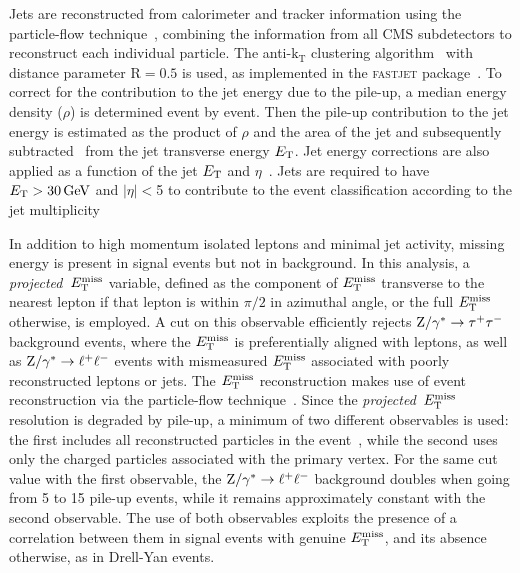 \documentclass[11pt,twoside,a4paper,cmspaper,final,collab]{cms-tdr}
\begin{document}
Jets are reconstructed from calorimeter and tracker information using
the particle-flow technique~\cite{PFT-09-001,jetpas}, combining the information from
all CMS subdetectors to reconstruct each individual particle. The anti-$\mathrm{k_T}$
clustering algorithm~\cite{antikt} with distance parameter $\mathrm{
R}=0.5$ is used, as implemented in the \textsc{fastjet}
package~\cite{Cacciari:fastjet1,Cacciari:fastjet2}.
To correct for the contribution to the jet energy
due to the pile-up, a median energy density ($\rho$) is determined event by event.
Then the pile-up contribution to the jet energy is estimated as the product of $\rho$ and the area of the
jet and subsequently subtracted~\cite{Cacciari:subtraction} from the jet transverse energy $E_{\mathrm{T}}$.
Jet energy corrections are also applied as a function of the jet $E_{\mathrm{T}}$ and $\eta$~\cite{cmsJEC}.
Jets are required to have $E_{\mathrm{T}}>30\,\text{Ge\hspace{-.08em}V}$ and $|\eta|<$5
to contribute to the event classification according to the jet multiplicity

In addition to high momentum isolated leptons and minimal jet activity, missing
energy is present in signal events but not in background.
In this analysis, a \textit{projected}~$E_{\mathrm{T}}^{\text{miss}}$ variable, defined
as the component of $E_{\mathrm{T}}^{\text{miss}}$ transverse to the nearest lepton if that lepton is within
$\pi/2$ in azimuthal angle, or the full $E_{\mathrm{T}}^{\text{miss}}$ otherwise, is employed.
A cut on this observable efficiently rejects $\mathrm{Z}/\gamma^* \to\tau^+\tau^-$ background events, where the $E_{\mathrm{T}}^{\text{miss}}$
is preferentially aligned with leptons, as well as $\mathrm{Z}/\gamma^*\to \ell^+\ell^-$ events with mismeasured
$E_{\mathrm{T}}^{\text{miss}}$ associated with poorly reconstructed leptons or jets.
The $E_{\mathrm{T}}^{\text{miss}}$ reconstruction makes use of event reconstruction via the particle-flow technique~\cite{PFT-09-001}.
Since the \textit{projected}~$E_{\mathrm{T}}^{\text{miss}}$ resolution is degraded by pile-up,
a minimum of two different observables is used: the first includes all reconstructed particles in the
event~\cite{PFT-09-001}, while the second uses only the charged
particles associated with the primary vertex. For the same
cut value with the first observable, the $\mathrm{Z}/\gamma^*\to \ell^+\ell^-$ background doubles
when going from 5 to 15 pile-up events, while it remains approximately constant with
the second observable. The use of both observables exploits
the presence of a correlation between them in signal events with genuine
$E_{\mathrm{T}}^{\text{miss}}$, and its absence otherwise, as in Drell-Yan events.
\end{document}
